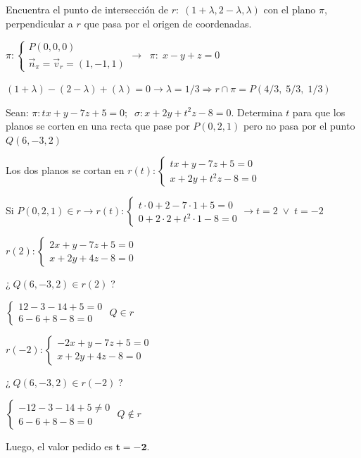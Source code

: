 \begin{ejre}
	Encuentra el punto de intersección de $r:\; (1+\lambda, 2-\lambda, \lambda)$ con el plano $\pi$, perpendicular a $r$ que pasa por el origen de coordenadas.
\end{ejre}

\begin{proofw}\renewcommand{\qedsymbol}{$\diamond$}
	$\pi: \begin{cases} P(0,0,0) \\ \vec n_{\pi}=\vec v_r=(1,-1,1)\end{cases} \to\; \; \pi:\; x-y+z=0$
	
\noindent $(1+\lambda)-(2-\lambda)+(\lambda)=0 \to \lambda =1/3 \Rightarrow r\cap \pi = P(4/3,\;5/3,\;1/3)$
\end{proofw}


\begin{ejre}
	Sean: $\pi: tx+y-7z+5=0;\;\; \sigma: x+2y+t^2z-8=0$. Determina $t$ para que los planos se corten en una recta que pase por $P(0,2,1)$ pero no pasa por el punto $Q(6,-3,2)$ 
\end{ejre}

\begin{proofw}\renewcommand{\qedsymbol}{$\diamond$}
	Los dos planos se cortan en $r(t):\begin{cases} tx+y-7z+5=0 \\  x+2y+t^2z-8=0 \end{cases}$
	
\noindent Si $P(0,2,1) \in r \to r(t):\begin{cases} t\cdot 0+2-7\cdot 1+5=0 \\  0+2\cdot 2+t^2\cdot 1-8=0 \end{cases} \to t=2 \;\vee\; t=-2$

\begin{multicols}{2}
\noindent $r(2):\begin{cases} 2x+y-7z+5=0 \\ x+2y+4z-8=0 \end{cases}$

\noindent ¿$\;Q(6,-3,2)\in r(2)\;$?

\noindent $\begin{cases} 12-3-14+5=0\\6-6+8-8=0\end{cases}$
\noindent $Q \in r$

\noindent $r(-2):\begin{cases} -2x+y-7z+5=0 \\ x+2y+4z-8=0 \end{cases}$

\noindent ¿$\;Q(6,-3,2)\in r(-2)\;$?

\noindent $\begin{cases} -12-3-14+5\neq0\\6-6+8-8=0\end{cases}$
\noindent $Q \notin r$	
\end{multicols}
Luego, el valor pedido es $\boldsymbol{t=-2}$.
\end{proofw}


